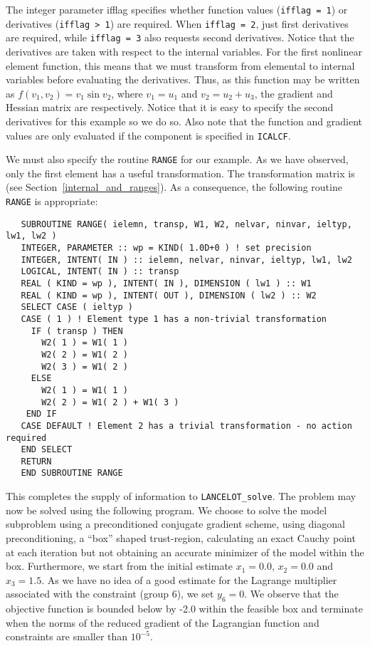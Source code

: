 \documentclass{galahad}
\newcommand{\fullpackagename}{LANC\-E\-LOT}
\newcommand{\solver}{{\tt \fullpackagename\_solve}}
\begin{document}
The integer parameter ifflag specifies whether function values
({\tt ifflag = 1}) or derivatives ({\tt ifflag > 1}) are required.
When {\tt ifflag = 2}, just first derivatives are required, while
{\tt ifflag = 3} also requests second derivatives.
Notice that the derivatives are taken with respect to
the internal variables.
For the first nonlinear element function,
this means that we must transform from elemental to internal
variables before evaluating the derivatives. Thus, as
this function may be written as $f(v_1,v_2)=v_1 \sin v_2$,
where $v_1 = u_1$ and $v_2 = u_2 + u_3$,
the gradient and Hessian matrix are
respectively. Notice that it is easy to specify the second
derivatives
for this example so we do so.
Also note that the function and gradient values
are only evaluated if the component is specified in {\tt ICALCF}.

We must also specify the routine {\tt RANGE} for our example.  As we
have observed, only the first element has a useful transformation.  The
transformation matrix is
(see Section~\ref{internal_and_ranges}).
As a consequence, the following routine {\tt RANGE} is appropriate:

\def\baselinestretch{0.8}
{%
{\tt \begin{verbatim}
   SUBROUTINE RANGE( ielemn, transp, W1, W2, nelvar, ninvar, ieltyp, lw1, lw2 )
   INTEGER, PARAMETER :: wp = KIND( 1.0D+0 ) ! set precision
   INTEGER, INTENT( IN ) :: ielemn, nelvar, ninvar, ieltyp, lw1, lw2
   LOGICAL, INTENT( IN ) :: transp
   REAL ( KIND = wp ), INTENT( IN ), DIMENSION ( lw1 ) :: W1
   REAL ( KIND = wp ), INTENT( OUT ), DIMENSION ( lw2 ) :: W2
   SELECT CASE ( ieltyp )
   CASE ( 1 ) ! Element type 1 has a non-trivial transformation
     IF ( transp ) THEN
       W2( 1 ) = W1( 1 )
       W2( 2 ) = W1( 2 )
       W2( 3 ) = W1( 2 )
     ELSE
       W2( 1 ) = W1( 1 )
       W2( 2 ) = W1( 2 ) + W1( 3 )
    END IF
   CASE DEFAULT ! Element 2 has a trivial transformation - no action required
   END SELECT
   RETURN
   END SUBROUTINE RANGE
\end{verbatim} } }
\def\baselinestretch{1.0}

This completes the supply of information to \solver.  The problem may
now be solved using the following program.  We choose to solve the model
subproblem using a preconditioned conjugate gradient scheme, using
diagonal preconditioning, a ``box'' shaped trust-region, calculating an
exact Cauchy point at each iteration but not obtaining an accurate
minimizer of the model within the box. Furthermore, we start from the
initial estimate $x_1 = 0.0$, $x_2 = 0.0$ and $x_3 = 1.5$. As we have no
idea of a good estimate for the Lagrange multiplier associated with the
constraint (group 6), we set $y_6 = 0$.  We observe that the objective
function is bounded below by -2.0 within the feasible box and terminate
when the norms of the reduced gradient of the Lagrangian function and
constraints are smaller than $10^{-5}$.
\end{document}
